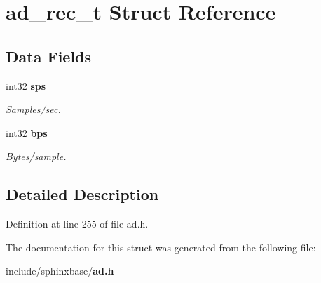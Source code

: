 \section{ad\-\_\-rec\-\_\-t \-Struct \-Reference}
\label{structad__rec__t}
\subsection*{\-Data \-Fields}
\begin{DoxyCompactItemize}
\item 
int32 {\bf sps}\label{structad__rec__t_ac8ccccdc755f68cb4ad24007b36d6c8a}

\begin{DoxyCompactList}\small\item\em \-Samples/sec. \end{DoxyCompactList}\item 
int32 {\bf bps}\label{structad__rec__t_ade5a608978908d87deea7fa9827f8510}

\begin{DoxyCompactList}\small\item\em \-Bytes/sample. \end{DoxyCompactList}\end{DoxyCompactItemize}


\subsection{\-Detailed \-Description}


\-Definition at line 255 of file ad.\-h.



\-The documentation for this struct was generated from the following file\-:\begin{DoxyCompactItemize}
\item 
include/sphinxbase/{\bf ad.\-h}\end{DoxyCompactItemize}
